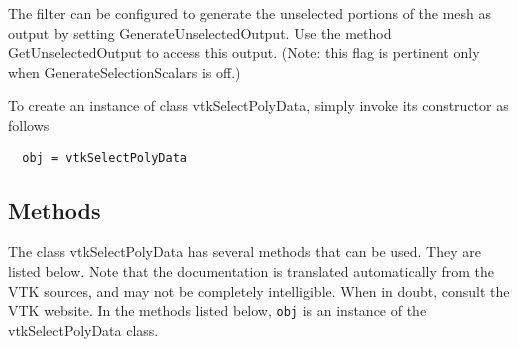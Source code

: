  The filter can be configured to generate the unselected portions of
 the mesh as output by setting GenerateUnselectedOutput. Use the
 method GetUnselectedOutput to access this output. (Note: this flag
 is pertinent only when GenerateSelectionScalars is off.)

To create an instance of class vtkSelectPolyData, simply
invoke its constructor as follows
\begin{verbatim}
  obj = vtkSelectPolyData
\end{verbatim}
\subsection{Methods}

The class vtkSelectPolyData has several methods that can be used.
  They are listed below.
Note that the documentation is translated automatically from the VTK sources,
and may not be completely intelligible.  When in doubt, consult the VTK website.
In the methods listed below, \verb|obj| is an instance of the vtkSelectPolyData class.
